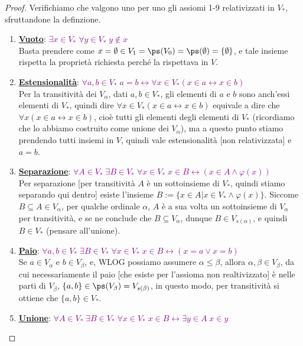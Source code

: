 \documentclass[11pt]{scrartcl}
\begin{document}
\begin{proof}
	Verifichiamo che valgono uno per uno gli assiomi 1-9 relativizzati in $V_*$, sfruttandone la definzione.
	\begin{enumerate}[(1)]
		\item \textbf{\underline{Vuoto}}: \textcolor{purple}{$\exists x \in V_* \; \forall y \in V_* \; y \not \in x$} \\
		Basta prendere come $x = \emptyset \in V_1 = \ps(V_0) = \ps(\emptyset) = \{\emptyset\}$, e tale insieme rispetta la proprietà richiesta perché la rispettava in $V$.
		\item \textbf{\underline{Estensionalità}}: \textcolor{purple}{$\forall a,b \in V_* \; a = b \leftrightarrow \forall x \in V_* (x \in a \leftrightarrow x \in b)$} \\
		Per la transitività dei $V_\alpha$, dati $a,b \in V_*$, gli elementi di $a$ e $b$ sono anch'essi elementi di $V_*$, quindi dire $\forall x \in V_* (x \in a \leftrightarrow x \in b)$ equivale a dire che $\forall x (x \in a \leftrightarrow x \in b)$, cioè
		tutti gli elementi degli elementi di $V_*$ (ricordiamo che lo abbiamo costruito come unione dei $V_\alpha$), ma a questo punto stiamo prendendo tutti insiemi in $V$, quindi vale estensionalità [non relativizzata] e $a = b$.
		\item \textbf{\underline{Separazione}}: \textcolor{purple}{$\forall A \in V_* \; \exists B \in V_* \; \forall x \in V_* \; x \in B \leftrightarrow (x \in A \land \varphi(x))$} \\
		Per separazione [per transitività $A$ è un sottoinsieme di $V_*$, quindi stiamo separando qui dentro] esiste l'insieme $B :=\{x \in A | x \in V_* \land \varphi(x)\}$. Siccome $B \subseteq A \in V_\alpha$, per qualche ordinale $\alpha$, $A$ è a sua volta un sottoinsieme di $V_\alpha$ per transitività, e se ne conclude che $B \subseteq V_\alpha$, dunque $B \in V_{s(\alpha)}$, e quindi $B \in V_*$ (pensare all'unione).
		\item \textbf{\underline{Paio}}: \textcolor{purple}{$\forall a,b \in V_* \; \exists B \in V_* \; \forall x \in V_* \; x \in B \leftrightarrow (x = a \lor x = b)$} \\
		Se $a \in V_\alpha$ e $b \in V_\beta$, e, WLOG possiamo assumere $\alpha \leq \beta$, allora $\alpha, \beta \in V_\beta$, da cui necessariamente il paio [che esiste per l'assioma non realtivizzato] è nelle parti di $V_\beta$, $\{a,b\} \in \ps(V_\beta) = V_{s(\beta)}$, in questo modo, per transitività si ottiene che $\{a,b\} \in V_*$.
		\item \textbf{\underline{Unione}}: \textcolor{purple}{$\forall A \in V_* \; \exists B \in V_* \; \forall x \in V_* \; x \in B \leftrightarrow \exists y \in A \; x \in y$} \\

\end{enumerate}
\end{proof}
\end{document}
